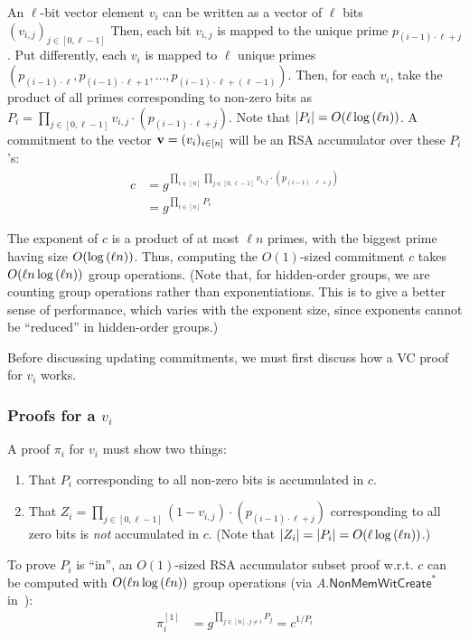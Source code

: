 An $\ell$-bit vector element $v_i$ can be written as a vector of $\ell$ bits $(v_{i,j})_{j\in [0,\ell-1]}$
Then, each bit $v_{i,j}$ is mapped to the unique prime $p_{(i-1)\cdot \ell + j}$.
Put differently, each $v_i$ is mapped to $\ell$ unique primes $(p_{(i-1)\cdot \ell}, p_{(i-1)\cdot \ell + 1},\dots, p_{(i-1)\cdot \ell+ (\ell - 1)})$.
Then, for each $v_i$, take the product of all primes corresponding to non-zero bits as $P_i = \prod_{j\in[0,\ell-1]} {v_{i,j}}\cdot \left(p_{(i-1)\cdot \ell + j}\right)$.
Note that $|P_i| = O(\ell \log{(\ell n)})$.
A commitment to the vector $\bm{\mathrm{v}}=(v_i)_{i\in [n]}$ will be an RSA accumulator over these $P_i$'s:
\begin{align}
c
  &=g^{\prod_{i\in [n]}\prod_{j\in[0,\ell-1]} v_{i,j}\cdot \left( p_{(i-1)\cdot \ell + j} \right)}\\
  &=g^{\prod_{i\in [n]} P_i}
\end{align}

The exponent of $c$ is a product of at most $\ell n$ primes, with the biggest prime having size $O(\log{(\ell n)})$.
Thus, computing the $O(1)$-sized commitment $c$ takes $O(\ell n \log{(\ell n)})$ group operations.
(Note that, for hidden-order groups, we are counting group operations rather than exponentiations.
This is to give a better sense of performance, which varies with the exponent size, since exponents cannot be ``reduced'' in hidden-order groups.)

Before discussing updating commitments, we must first discuss how a VC proof for $v_i$ works.

\subsubsection{Proofs for a $v_i$}
A proof $\pi_i$ for $v_i$ must show two things:
\begin{enumerate}
\item That $P_i$ corresponding to all non-zero bits is accumulated in $c$.
\item That $Z_i= \prod_{j\in[0,\ell-1]} {(1-v_{i,j})}\cdot \left(p_{(i-1)\cdot \ell + j}\right)$ corresponding to all zero bits is \textit{not} accumulated in $c$.
(Note that $|Z_i|=|P_i|=O(\ell\log{(\ell n)})$.)
\end{enumerate}

To prove $P_i$ is ``in'', an $O(1)$-sized RSA accumulator subset proof w.r.t. $c$ can be computed with $O(\ell n \log{(\ell n)})$ group operations (via \textit{A}.$\mathsf{NonMemWitCreate}^*$ in~\cite[Sec 4.2, pg. 15]{BBF18}):
\begin{align}
\pi_i^{[1]} &=g^{\prod_{j\in [n],j \ne i} P_j} = c^{1/P_i}
\end{align}


